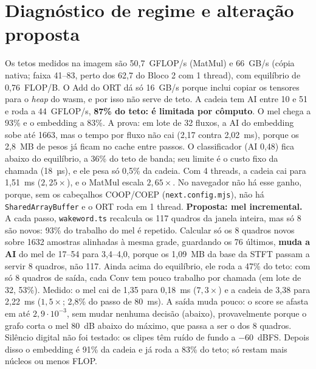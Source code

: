 \documentclass[10pt,a4paper]{article}
\begin{document}
\section{Diagnóstico de regime e alteração proposta}
Os tetos medidos na imagem são 50,7~GFLOP/s (MatMul) e 66~GB/s (cópia nativa; faixa 41–83, perto dos 62,7 do Bloco 2 com 1 thread), com equilíbrio de 0,76~FLOP/B. O Add do ORT dá só 16~GB/s porque inclui copiar os tensores para o \textit{heap} do wasm, e por isso não serve de teto.
A cadeia tem AI entre 10 e 51 e roda a 44~GFLOP/s, \textbf{87\% do teto: é limitada por cômputo}. O mel chega a 93\% e o embedding a 83\%.
A prova: em lote de 32 fluxos, a AI do embedding sobe até 1663, mas o tempo por fluxo não cai (2,17 contra 2,02~ms), porque os 2,8~MB de pesos já ficam no cache entre passos.
O classificador (AI 0,48) fica abaixo do equilíbrio, a 36\% do teto de banda; seu limite é o custo fixo da chamada (18~µs), e ele pesa só 0,5\% da cadeia.
Com 4 threads, a cadeia cai para 1,51~ms ($2{,}25\times$), e o MatMul escala $2{,}65\times$.
No navegador não há esse ganho, porque, sem os cabeçalhos COOP/COEP (\texttt{next.config.mjs}), não há \texttt{SharedArrayBuffer} e o ORT roda em 1 thread.
\textbf{Proposta: mel incremental.} A cada passo, \texttt{wakeword.ts} recalcula os 117 quadros da janela inteira, mas só 8 são novos: 93\% do trabalho do mel é repetido.
Calcular só os 8 quadros novos sobre 1632 amostras alinhadas à mesma grade, guardando os 76 últimos, \textbf{muda a AI} do mel de 17–54 para 3,4–4,0, porque os 1,09~MB da base da STFT passam a servir 8 quadros, não 117.
Ainda acima do equilíbrio, ele roda a 47\% do teto: com só 8 quadros de saída, cada Conv tem pouco trabalho por chamada (em lote de 32, 53\%).
Medido: o mel cai de 1,35 para 0,18~ms ($7{,}3\times$) e a cadeia de 3,38 para 2,22~ms ($1{,}5\times$; 2,8\% do passo de 80~ms).
A saída muda pouco: o score se afasta em até $2{,}9\cdot10^{-3}$, sem mudar nenhuma decisão (abaixo), provavelmente porque o grafo corta o mel 80~dB abaixo do máximo, que passa a ser o dos 8 quadros. Silêncio digital não foi testado: os clipes têm ruído de fundo a $-60$~dBFS.
Depois disso o embedding é 91\% da cadeia e já roda a 83\% do teto; só restam mais núcleos ou menos FLOP.
\end{document}

